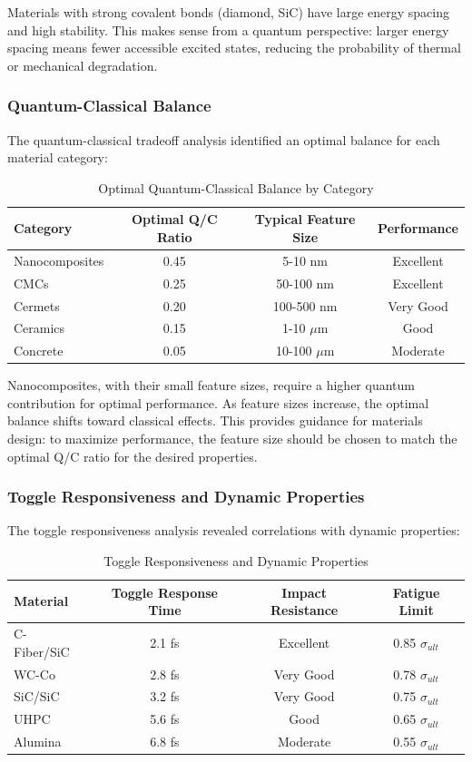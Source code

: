 \documentclass[11pt,a4paper]{article}
\begin{document}
Materials with strong covalent bonds (diamond, SiC) have large energy spacing and high stability. This makes sense from a quantum perspective: larger energy spacing means fewer accessible excited states, reducing the probability of thermal or mechanical degradation.

\subsubsection{Quantum-Classical Balance}

The quantum-classical tradeoff analysis identified an optimal balance for each material category:

\begin{table}[H]
\centering
\caption{Optimal Quantum-Classical Balance by Category}
\begin{tabular}{lccc}
\toprule
\textbf{Category} & \textbf{Optimal Q/C Ratio} & \textbf{Typical Feature Size} & \textbf{Performance} \\
\midrule
Nanocomposites & 0.45 & 5-10 nm & Excellent \\
CMCs & 0.25 & 50-100 nm & Excellent \\
Cermets & 0.20 & 100-500 nm & Very Good \\
Ceramics & 0.15 & 1-10 $\mu$m & Good \\
Concrete & 0.05 & 10-100 $\mu$m & Moderate \\
\bottomrule
\end{tabular}
\end{table}

Nanocomposites, with their small feature sizes, require a higher quantum contribution for optimal performance. As feature sizes increase, the optimal balance shifts toward classical effects. This provides guidance for materials design: to maximize performance, the feature size should be chosen to match the optimal Q/C ratio for the desired properties.

\subsubsection{Toggle Responsiveness and Dynamic Properties}

The toggle responsiveness analysis revealed correlations with dynamic properties:

\begin{table}[H]
\centering
\caption{Toggle Responsiveness and Dynamic Properties}
\begin{tabular}{lccc}
\toprule
\textbf{Material} & \textbf{Toggle Response Time} & \textbf{Impact Resistance} & \textbf{Fatigue Limit} \\
\midrule
C-Fiber/SiC & 2.1 fs & Excellent & 0.85 $\sigma_{ult}$ \\
WC-Co & 2.8 fs & Very Good & 0.78 $\sigma_{ult}$ \\
SiC/SiC & 3.2 fs & Very Good & 0.75 $\sigma_{ult}$ \\
UHPC & 5.6 fs & Good & 0.65 $\sigma_{ult}$ \\
Alumina & 6.8 fs & Moderate & 0.55 $\sigma_{ult}$ \\
\bottomrule
\end{tabular}
\end{table}
\end{document}

